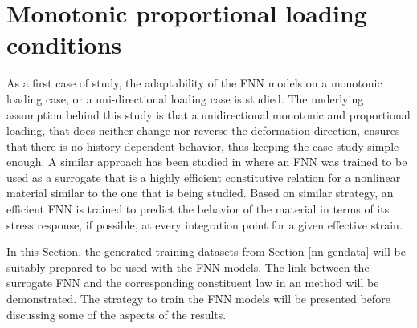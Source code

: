 \section{Monotonic proportional loading conditions}\label{nn-mono}

As a first case of study, the adaptability of the FNN models on a monotonic loading case, or a uni-directional loading case is studied. The underlying assumption behind this study is that a unidirectional monotonic and proportional loading, that does neither change nor reverse the deformation direction, ensures that there is no history dependent behavior, thus keeping the case study simple enough. A similar approach has been studied in \cite{fritzenOntheflyAdaptivityNonlinear2019} where an FNN was trained to be used as a surrogate that is a highly efficient constitutive relation for a nonlinear material similar to the one that is being studied. Based on similar strategy, an efficient FNN is trained to predict the behavior of the material in terms of its stress response, if possible, at every integration point for a given effective strain.

In this Section, the generated training datasets from Section \ref{nn-gendata} will be suitably prepared to be used with the FNN models. The link between the surrogate FNN and the corresponding constituent law in an \fee method will be demonstrated. The strategy to train the FNN models will be presented before discussing some of the aspects of the results.


